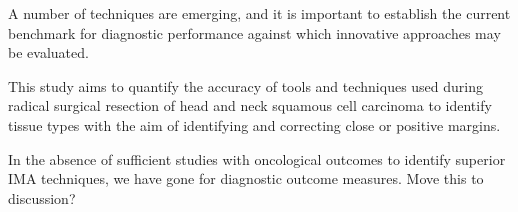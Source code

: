 A number of techniques are emerging, and it is important to establish the current benchmark for diagnostic performance against which innovative approaches may be evaluated.

This study aims to quantify the accuracy of tools and techniques used during radical surgical resection of head and neck squamous cell carcinoma to identify tissue types with the aim of identifying and correcting close or positive margins.

In the absence of sufficient studies with oncological outcomes to identify superior IMA techniques, we have gone for diagnostic outcome measures. Move this to discussion?

